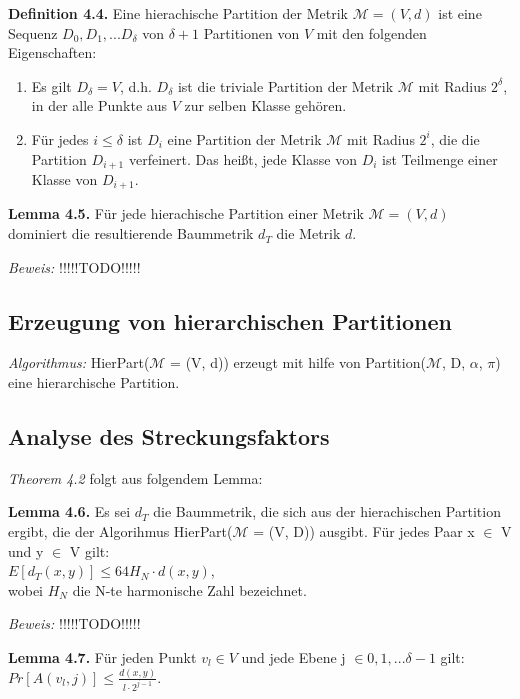 \textbf{Definition 4.4.} Eine hierachische Partition der Metrik $\mathcal{M} = (V, d)$ ist eine Sequenz $D_{0}, D_{1}, ... D_{\delta}$ von $\delta + 1$ Partitionen von $V$ mit den folgenden Eigenschaften:
\begin{enumerate}
\item Es gilt $D_{\delta} = {V}$, d.h. $D_{\delta}$ ist die triviale Partition der Metrik $\mathcal{M}$ mit Radius $2^{\delta}$, in der alle Punkte aus $V$ zur selben Klasse gehören.
\item Für jedes $i \le \delta$ ist $D_{i}$ eine Partition der Metrik $\mathcal{M}$ mit Radius $2^{i}$, die die Partition $D_{i+1}$ verfeinert. Das heißt, jede Klasse von $D_{i}$ ist Teilmenge einer Klasse von $D_{i+1}$.
\end{enumerate}

\textbf{Lemma 4.5.} Für jede hierachische Partition einer Metrik $\mathcal{M} = (V, d)$ dominiert die resultierende Baummetrik $d_{T}$ die Metrik $d$.

\textit{Beweis:} !!!!!TODO!!!!!

\subsection{Erzeugung von hierarchischen Partitionen}

\textit{Algorithmus:} HierPart($\mathcal{M}$ = (V, d)) erzeugt mit hilfe von Partition($\mathcal{M}$, D, $\alpha$, $\pi$) eine hierarchische Partition.

\subsection{Analyse des Streckungsfaktors}

\textit{Theorem 4.2} folgt aus folgendem Lemma:

\textbf{Lemma 4.6.} Es sei $d_{T}$ die Baummetrik, die sich aus der hierachischen Partition ergibt, die der Algorihmus HierPart($\mathcal{M}$ = (V, D)) ausgibt. Für jedes Paar x $\in$ V und y $\in$ V gilt:\\
$E[d_{T}(x, y)] \le 64 H_{N} \cdot d(x, y)$, \\
wobei $H_{N}$ die N-te harmonische Zahl bezeichnet.

\textit{Beweis:} !!!!!TODO!!!!!

\textbf{Lemma 4.7.} Für jeden Punkt $v_{l} \in V$ und jede Ebene j $\in {0, 1, ... \delta -1}$ gilt: \\
$Pr[A(v_{l}, j)] \le \tfrac{d(x, y)}{l \cdot 2^{j-1}}.$

